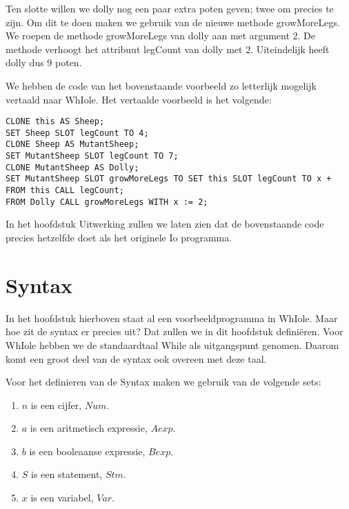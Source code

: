 \documentclass[12pt]{article}
\begin{document}
Ten slotte willen we dolly nog een paar extra poten geven; twee om precies te zijn.
Om dit te doen maken we gebruik van de nieuwe methode growMoreLegs.
We roepen de methode growMoreLegs van dolly aan met argument 2.
De methode verhoogt het attribuut legCount van dolly met 2.
Uiteindelijk heeft dolly dus 9 poten.

\newline

We hebben de code van het bovenstaande voorbeeld zo letterlijk mogelijk vertaald naar WhIole.
Het vertaalde voorbeeld is het volgende:
\begin{lstlisting}[frame=single]
CLONE this AS Sheep;
SET Sheep SLOT legCount TO 4;
CLONE Sheep AS MutantSheep;
SET MutantSheep SLOT legCount TO 7;
CLONE MutantSheep AS Dolly;
SET MutantSheep SLOT growMoreLegs TO SET this SLOT legCount TO x + FROM this CALL legCount;
FROM Dolly CALL growMoreLegs WITH x := 2;
\end{lstlisting}
In het hoofdstuk Uitwerking zullen we laten zien dat de bovenstaande code precies hetzelfde doet als het originele Io programma.

\pagebreak
\section{Syntax}
In het hoofdstuk hierboven staat al een voorbeeldprogramma in WhIole. Maar hoe zit de syntax er precies uit? Dat zullen we in dit hoofdstuk definiëren. Voor WhIole hebben we de standaardtaal While als uitgangspunt genomen. Daarom komt een groot deel van de syntax ook overeen met deze taal.

Voor het definieren van de Syntax maken we gebruik van de volgende sets: 
\begin{enumerate}[noitemsep]
	\item[] $n$ is een cijfer, $Num$.
	\item[] $a$ is een aritmetisch expressie, $Aexp$.
	\item[] $b$ is een booleaanse expressie, $Bexp$. 
	\item[] $S$ is een statement, $Stm$. 
	\item[] $x$ is een variabel, $Var$. 
\end{enumerate}	 
\end{document}
